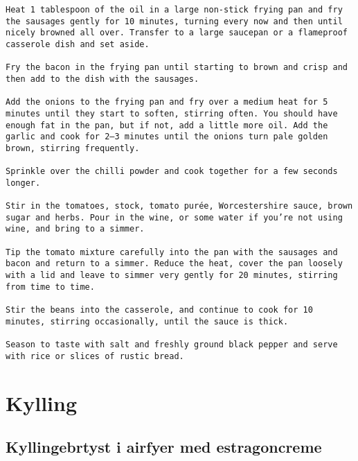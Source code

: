 \documentclass[
  letterpaper,
  DIV=11,
  numbers=noendperiod]{scrreprt}
\begin{document}
\begin{verbatim}
Heat 1 tablespoon of the oil in a large non-stick frying pan and fry the sausages gently for 10 minutes, turning every now and then until nicely browned all over. Transfer to a large saucepan or a flameproof casserole dish and set aside.

Fry the bacon in the frying pan until starting to brown and crisp and then add to the dish with the sausages.

Add the onions to the frying pan and fry over a medium heat for 5 minutes until they start to soften, stirring often. You should have enough fat in the pan, but if not, add a little more oil. Add the garlic and cook for 2–3 minutes until the onions turn pale golden brown, stirring frequently.

Sprinkle over the chilli powder and cook together for a few seconds longer.

Stir in the tomatoes, stock, tomato purée, Worcestershire sauce, brown sugar and herbs. Pour in the wine, or some water if you’re not using wine, and bring to a simmer.

Tip the tomato mixture carefully into the pan with the sausages and bacon and return to a simmer. Reduce the heat, cover the pan loosely with a lid and leave to simmer very gently for 20 minutes, stirring from time to time.

Stir the beans into the casserole, and continue to cook for 10 minutes, stirring occasionally, until the sauce is thick.

Season to taste with salt and freshly ground black pepper and serve with rice or slices of rustic bread.
\end{verbatim}


\hypertarget{kylling}{%
\chapter{Kylling}\label{kylling}}

\hypertarget{kyllingebrtyst-i-airfyer-med-estragoncreme}{%
\section{Kyllingebrtyst i airfyer med
estragoncreme}\label{kyllingebrtyst-i-airfyer-med-estragoncreme}}
\end{document}
